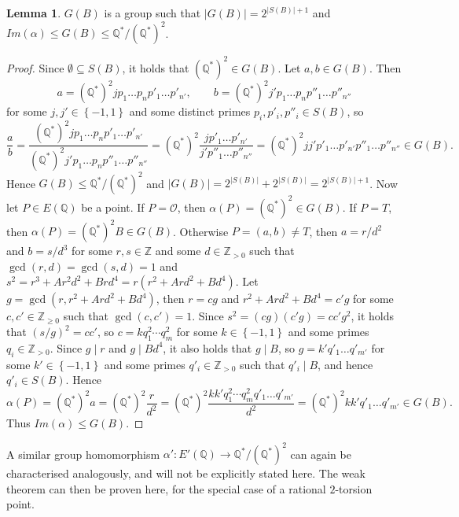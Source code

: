 \documentclass{article}
\newcommand{\Z}{\mathbb{Z}}
\newcommand{\Q}{\mathbb{Q}}
\newcommand{\rb}[1]{\left( #1 \right)}
\newcommand{\cb}[1]{\left\{ #1 \right\}}
\newcommand{\abs}[1]{\left\lvert #1 \right\rvert}
\theoremstyle{definition}
\newtheorem{lemma}[proposition]{Lemma}
\begin{document}
\begin{lemma}
$ G\rb{B} $ is a group such that $ \abs{G\rb{B}} = 2^{\abs{S\rb{B}} + 1} $ and $ Im\rb{\alpha} \le G\rb{B} \le \Q^* / \rb{\Q^*}^2 $.
\end{lemma}

\begin{proof}
Since $ \emptyset \subseteq S\rb{B} $, it holds that $ \rb{\Q^*}^2 \in G\rb{B} $. Let $ a, b \in G\rb{B} $. Then
$$ a = \rb{\Q^*}^2 j p_1 \dots p_n p'_1 \dots p'_{n'}, \qquad b = \rb{\Q^*}^2 j' p_1 \dots p_n p''_1 \dots p''_{n''} $$
for some $ j, j' \in \cb{-1, 1} $ and some distinct primes $ p_i, p'_i, p''_i \in S\rb{B} $, so
$$ \dfrac{a}{b} = \dfrac{\rb{\Q^*}^2 j p_1 \dots p_n p'_1 \dots p'_{n'}}{\rb{\Q^*}^2 j' p_1 \dots p_n p''_1 \dots p''_{n''}} = \rb{\Q^*}^2\dfrac{j p'_1 \dots p'_{n'}}{j' p''_1 \dots p''_{n''}} = \rb{\Q^*}^2 j j' p'_1 \dots p'_{n'} p''_1 \dots p''_{n''} \in G\rb{B}. $$
Hence $ G\rb{B} \le \Q^* / \rb{\Q^*}^2 $ and $ \abs{G\rb{B}} = 2^{\abs{S\rb{B}}} + 2^{\abs{S\rb{B}}} = 2^{\abs{S\rb{B}} + 1} $. Now let $ P \in E\rb{\Q} $ be a point. If $ P = \mathcal{O} $, then $ \alpha\rb{P} = \rb{\Q^*}^2 \in G\rb{B} $. If $ P = T $, then $ \alpha\rb{P} = \rb{\Q^*}^2B \in G\rb{B} $. Otherwise $ P = \rb{a, b} \ne T $, then $ a = r / d^2 $ and $ b = s / d^3 $ for some $ r, s \in \Z $ and some $ d \in \Z_{> 0} $ such that $ \gcd\rb{r, d} = \gcd\rb{s, d} = 1 $ and $ s^2 = r^3 + Ar^2d^2 + Brd^4 = r\rb{r^2 + Ard^2 + Bd^4} $. Let $ g = \gcd\rb{r, r^2 + Ard^2 + Bd^4} $, then $ r = cg $ and $ r^2 + Ard^2 + Bd^4 = c'g $ for some $ c, c' \in \Z_{\ge 0} $ such that $ \gcd\rb{c, c'} = 1 $. Since $ s^2 = \rb{cg}\rb{c'g} = cc'g^2 $, it holds that $ \rb{s / g}^2 = cc' $, so $ c = k q_1^2 \cdots q_m^2 $ for some $ k \in \cb{-1, 1} $ and some primes $ q_i \in \Z_{> 0} $. Since $ g \mid r $ and $ g \mid Bd^4 $, it also holds that $ g \mid B $, so $ g = k' q'_1 \dots q'_{m'} $ for some $ k' \in \cb{-1, 1} $ and some primes $ q'_i \in \Z_{> 0} $ such that $ q'_i \mid B $, and hence $ q'_i \in S\rb{B} $. Hence
$$ \alpha\rb{P} = \rb{\Q^*}^2a = \rb{\Q^*}^2\dfrac{r}{d^2} = \rb{\Q^*}^2\dfrac{k k' q_1^2 \cdots q_m^2 q'_1 \dots q'_{m'}}{d^2} = \rb{\Q^*}^2 k k' q'_1 \dots q'_{m'} \in G\rb{B}. $$
Thus $ Im\rb{\alpha} \le G\rb{B} $.
\end{proof}

A similar group homomorphism $ \alpha' : E'\rb{\Q} \to \Q^* / \rb{\Q^*}^2 $ can again be characterised analogously, and will not be explicitly stated here. The weak theorem can then be proven here, for the special case of a rational $ 2 $-torsion point.
\end{document}
